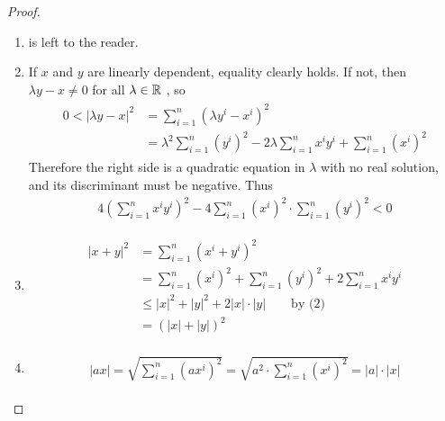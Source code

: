 \begin{proof}
    \begin{enumerate}[label={\upshape(\arabic*)}]
        \item is left to the reader.
        \item If $x$ and $y$ are linearly dependent, equality clearly holds.
            If not, then $\lambda y - x\neq 0$  for all $\lambda\in \mathbb{R}$ , so
            \begin{align*}\begin{aligned}
                0 < |\lambda y - x|^2 
                & = \sum_{i=1 }^{n }{(\lambda y^i - x^i)^2} \\
                & = \lambda^2 \sum_{i=1 }^{n }{(y^i)^2 - 2\lambda \sum_{i=1 }^{n }{x^iy^i}} + \sum_{i=1 }^{n }{(x^i)^2} 
            \end{aligned}\end{align*}
            Therefore the right side is a quadratic equation in $\lambda$ with no
            real solution, and its discriminant must be negative. Thus
            \begin{align*}
                4\left(\sum_{i=1 }^{n }{x^iy^i}\right)^2 - 4 \sum_{i=1 }^{n }{(x^i)^2}\cdot \sum_{i=1 }^{n }{(y^i)^2} < 0
            \end{align*}
        \item \quad \vspace*{-2.5em}
            \begin{align*}\begin{aligned}
                \left|x+y\right|^2 
                & = \sum_{i=1 }^{n }{(x^i + y^i)^2} \\
                & = \sum_{i=1 }^{n }{(x^i)^2} + \sum_{i=1 }^{n }{(y^i)^2} +  2\sum_{i=1 }^{n }{x^iy^i} \\
                & \le |x|^2 + |y|^2 + 2|x|\cdot |y| \qquad \text{by (2)}\\
                & = \left(|x| + |y|\right)^2
            \end{aligned}\end{align*}
        \item 
            \begin{align*}\begin{aligned}
                |ax| 
                = \sqrt{\sum_{i=1 }^{n }{(ax^i)^2}} 
                = \sqrt{a^2\cdot \sum_{i=1}^{n }{(x^i)^2}}
                = |a|\cdot |x|
            \end{aligned}\end{align*}
    \end{enumerate}
\end{proof}

